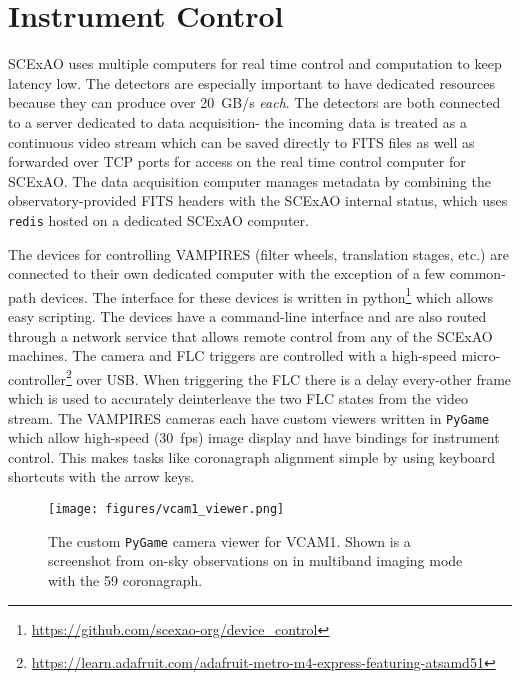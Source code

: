 \section{Instrument Control}\label{sec:control}

SCExAO uses multiple computers for real time control and computation to keep latency low. The detectors are especially important to have dedicated resources because they can produce over \SI{20}{GB/s} \textit{each}. The detectors are both connected to a server dedicated to data acquisition- the incoming data is treated as a continuous video stream which can be saved directly to FITS files as well as forwarded over TCP ports for access on the real time control computer for SCExAO. The data acquisition computer manages metadata by combining the observatory-provided FITS headers with the SCExAO internal status, which uses \texttt{redis} hosted on a dedicated SCExAO computer.

The devices for controlling VAMPIRES (filter wheels, translation stages, etc.) are connected to their own dedicated computer with the exception of a few common-path devices. The interface for these devices is written in python\footnote{\url{https://github.com/scexao-org/device_control}} which allows easy scripting. The devices have a command-line interface and are also routed through a network service that allows remote control from any of the SCExAO machines. The camera and FLC triggers are controlled with a high-speed micro-controller\footnote{\url{https://learn.adafruit.com/adafruit-metro-m4-express-featuring-atsamd51}} over USB. When triggering the FLC there is a delay every-other frame which is used to accurately deinterleave the two FLC states from the video stream. The VAMPIRES cameras each have custom viewers written in \texttt{PyGame} which allow high-speed (\SI{30}{fps}) image display and have bindings for instrument control. This makes tasks like coronagraph alignment simple by using keyboard shortcuts with the arrow keys.

\begin{figure}
    \centering
    \texttt{[image: figures/vcam1\_viewer.png]}
    \caption{The custom \texttt{PyGame} camera viewer for VCAM1. Shown is a screenshot from on-sky observations on  in multiband imaging mode with the \SI{59}{\mas} coronagraph.}
    \label{fig:vcam1}
\end{figure}
